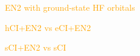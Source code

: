 \documentclass[aip,jcp,reprint,noshowkeys,superscriptaddress]{revtex4-1}
\newcommand{\fk}[1]{\textcolor{orange}{#1}}
\newcommand{\SupInf}{\textcolor{blue}{Supporting Information}}
\newcommand{\mc}{\multicolumn}
\begin{document}
\fk{EN2 with ground-state HF orbitals}

\fk{hCI+EN2 vs eCI+EN2}

\fk{sCI+EN2 vs sCI}

\end{document}
